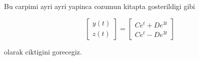 \documentclass[12pt,fleqn]{article}\usepackage{../common}
\begin{document}
Bu carpimi ayri ayri yapinca cozumun kitapta gosterildigi gibi

\[  
\left[\begin{array}{r}
y(t) \\
z(t)
\end{array}\right]
=
\left[\begin{array}{r}
Ce^t + De^{3t} \\
Ce^t - De^{3t} 
\end{array}\right]
\]

olarak ciktigini gorecegiz. 
\end{document}
